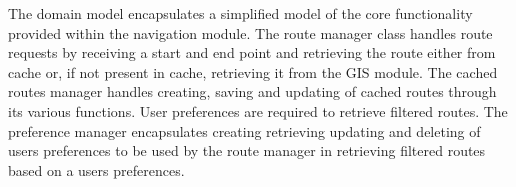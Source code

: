\documentclass[12pt]{article}
\begin{document}
The domain model encapsulates a simplified model of the core functionality provided within the navigation module. The route manager class handles route requests by receiving a start and end point and retrieving the route either from cache or, if not present in cache, retrieving it from the GIS module. 
The cached routes manager handles creating, saving and updating of cached routes through its various functions.
User preferences are required to retrieve filtered routes. The preference manager encapsulates creating retrieving updating and deleting of users preferences to be used by the route manager in retrieving filtered routes based on a users preferences.
\end{document}

